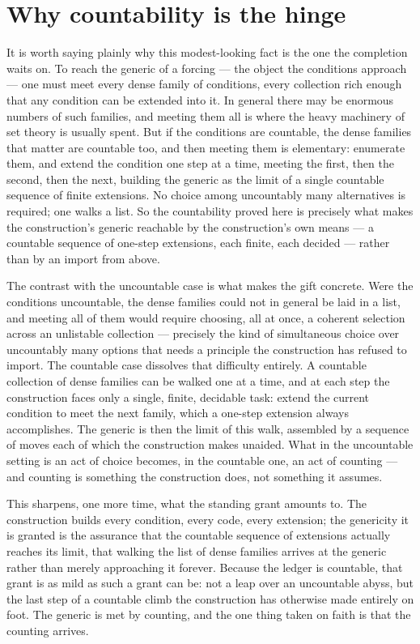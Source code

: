 \section{Why countability is the hinge}
\label{se:why-countability-is-the-hinge}

It is worth saying plainly why this modest-looking fact is the one the completion waits on. To reach the
generic of a forcing --- the object the conditions approach --- one must meet every dense family of
conditions, every collection rich enough that any condition can be extended into it. In general there
may be enormous numbers of such families, and meeting them all is where the heavy machinery of set theory
is usually spent. But if the conditions are countable, the dense families that matter are countable too,
and then meeting them is elementary: enumerate them, and extend the condition one step at a time, meeting
the first, then the second, then the next, building the generic as the limit of a single countable
sequence of finite extensions. No choice among uncountably many alternatives is required; one walks a
list. So the countability proved here is precisely what makes the construction's generic reachable by the
construction's own means --- a countable sequence of one-step extensions, each finite, each decided ---
rather than by an import from above.

The contrast with the uncountable case is what makes the gift concrete. Were the conditions uncountable,
the dense families could not in general be laid in a list, and meeting all of them would require choosing,
all at once, a coherent selection across an unlistable collection --- precisely the kind of simultaneous
choice over uncountably many options that needs a principle the construction has refused to import. The
countable case dissolves that difficulty entirely. A countable collection of dense families can be walked
one at a time, and at each step the construction faces only a single, finite, decidable task: extend the
current condition to meet the next family, which a one-step extension always accomplishes. The generic is
then the limit of this walk, assembled by a sequence of moves each of which the construction makes
unaided. What in the uncountable setting is an act of choice becomes, in the countable one, an act of
counting --- and counting is something the construction does, not something it assumes.

This sharpens, one more time, what the standing grant amounts to. The construction builds every
condition, every code, every extension; the genericity it is granted is the assurance that the countable
sequence of extensions actually reaches its limit, that walking the list of dense families arrives at the
generic rather than merely approaching it forever. Because the ledger is countable, that grant is as mild
as such a grant can be: not a leap over an uncountable abyss, but the last step of a countable climb the
construction has otherwise made entirely on foot. The generic is met by counting, and the one thing taken
on faith is that the counting arrives.

